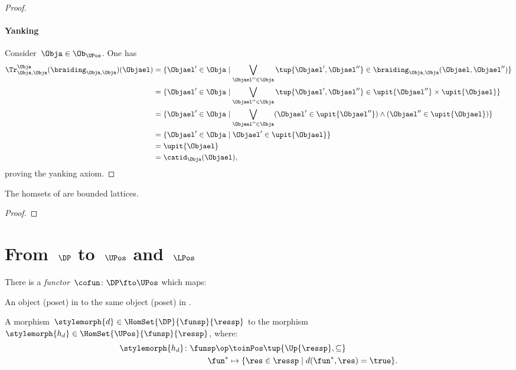 \begin{proof}
    \paragraph*{Yanking}
    Consider~$\Obja\in \Ob_\UPos$. One has
    \begin{equation*}
    \begin{aligned}
        \Tr_{\Obja,\Obja}^{\Obja}(\braiding_{\Obja,\Obja})(\Objael)&=\{ \Objael'\in \Obja \mid \bigvee_{\Objael''\in \Obja}\tup{\Objael',\Objael''}\in \braiding_{\Obja,\Obja}(\Objael,\Objael'')\}\\
        &=\{ \Objael'\in \Obja \mid \bigvee_{\Objael''\in \Obja}\tup{\Objael',\Objael''}\in \upit\{\Objael''\}\times \upit\{ \Objael\}\}\\
        &=\{ \Objael'\in \Obja \mid \bigvee_{\Objael''\in \Obja} (\Objael'\in \upit\{\Objael''\}) \wedge(\Objael'' \in \upit\{ \Objael\})\}\\
        &=\{ \Objael'\in \Obja \mid \Objael'\in \upit\{\Objael\}\}\\
        &=\upit \{\Objael\}\\
        &=\catid_\Obja(\Objael),
    \end{aligned}
    \end{equation*}
    proving the yanking axiom.
\end{proof}

\begin{lemma}\label{lem:UPos-is-traced}
    The homsets of \UPos are bounded lattices.
  \end{lemma}
  \begin{proof}
  \end{proof}
  
  

\section{From~$\DP$ to~$\UPos$ and~$\LPos$}
\begin{lemma}
\label{lem:covfunctor}
There is a \emph{functor}~$\cofun\colon \DP \fto \UPos$ which maps:
\begin{compactenum}
\item An object (poset) in \DP to the same object (poset) in \UPos.
\item A morphism~$\stylemorph{d}\in \HomSet{\DP}{\funsp}{\ressp}$ to the morphism~$\stylemorph{h_d}\in \HomSet{\UPos}{\funsp}{\ressp}$, where:
\begin{equation}
\begin{aligned}
    \stylemorph{h_d}\colon \funsp\op &\toinPos \tup{\Up{\ressp},\subseteq}\\
    \fun^*&\mapsto \{\res \in \ressp\mid d(\fun^*,\res)=\true\}.
\end{aligned}
\end{equation}
\end{compactenum}
\end{lemma}

